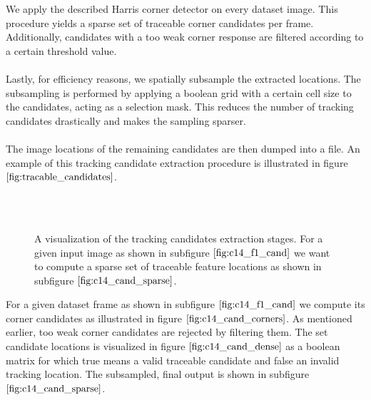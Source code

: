 We apply the described Harris corner detector on every dataset image. This procedure yields a sparse set of traceable corner candidates per frame. Additionally, candidates with a too weak corner response are filtered according to a certain threshold value. \\ \\
Lastly, for efficiency reasons, we spatially subsample the extracted locations. The subsampling is performed by applying a boolean grid with a certain cell size to the candidates, acting as a selection mask. This reduces the number of tracking candidates drastically and makes the sampling sparser. \\ \\
The image locations of the remaining candidates are then dumped into a file. An example of this tracking candidate extraction procedure is illustrated in figure $\ref{fig:tracable_candidates}$. \\ \\
\begin{figure}[H]
\begin{center}
~
\end{center}
\caption[Tracking Candidates]{A visualization of the tracking candidates extraction stages. For a given input image as shown in subfigure $\ref{fig:c14_f1_cand}$ we want to compute a sparse set of traceable feature locations as shown in subfigure $\ref{fig:c14_cand_sparse}$.}
\label{fig:tracable_candidates}
\end{figure}
For a given dataset frame as shown in subfigure $\ref{fig:c14_f1_cand}$ we compute its corner candidates as illustrated in figure $\ref{fig:c14_cand_corners}$. As mentioned earlier, too weak corner candidates are rejected by filtering them. The set candidate locations is visualized in figure $\ref{fig:c14_cand_dense}$ as a boolean matrix for which true means a valid traceable candidate and false an invalid tracking location. The subsampled, final output is shown in subfigure $\ref{fig:c14_cand_sparse}$. \\ \\

